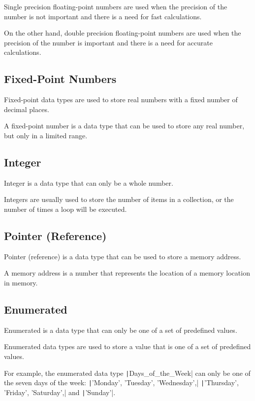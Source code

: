 \documentclass{book}
\begin{document}
    \noindent Single precision floating-point numbers are used when the precision of the number is not important and there is a need for fast calculations.

    \noindent On the other hand, double precision floating-point numbers are used when the precision of the number is important and there is a need for accurate calculations.

\subsection{Fixed-Point Numbers}

    Fixed-point data types are used to store real numbers with a fixed number of decimal places.

    \noindent A fixed-point number is a data type that can be used to store any real number, but only in a limited range.

\subsection{Integer}

    Integer is a data type that can only be a whole number.
    
    \noindent Integers are usually used to store the number of items in a collection, or the number of times a loop will be executed.

\subsection{Pointer (Reference)}

    Pointer (reference) is a data type that can be used to store a memory address.
    
    \noindent A memory address is a number that represents the location of a memory location in memory.

\subsection{Enumerated}

    Enumerated is a data type that can only be one of a set of predefined values.
    
    \noindent Enumerated data types are used to store a value that is one of a set of predefined values.
    
    For example, the enumerated data type \texttt|Days_of_the_Week| can only be one of the seven days of the week: \texttt|'Monday', 'Tuesday', 'Wednesday',| \texttt|'Thursday', 'Friday', 'Saturday',| and \texttt|'Sunday'|.
\end{document}
